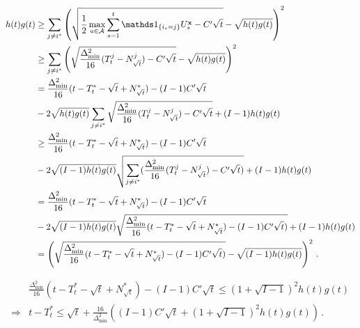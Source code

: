 \begin{align*}
    h(t)g(t) &\ge \sum_{j\neq i^*} \left(\sqrt{\frac{1}{2}\max_{a\in \mathcal A} \sum_{s=1}^t \ind_{\{i_s=j\}} U_s^\bx - C'\sqrt{t}} - \sqrt{h(t)g(t)}\right)^2\\
    &\ge \sum_{j\neq i^*} \left(\sqrt{\frac{\Delta_{\min}^2}{16} (T_t^j - N_{\sqrt{t}}^j) - C'\sqrt{t}} - \sqrt{h(t)g(t)}\right)^2\\
    &= \frac{\Delta_{\min}^2}{16} (t - T_t^* - \sqrt{t} + N_{\sqrt{t}}^*) - (I-1)C'\sqrt{t}\\
    &- 2\sqrt{h(t)g(t)}\sum_{j\neq i^*}\sqrt{\frac{\Delta_{\min}^2}{16} (T_t^j - N_{\sqrt{t}}^j) - C'\sqrt{t}} + (I-1)h(t)g(t)\\
    &\ge \frac{\Delta_{\min}^2}{16} (t - T_t^* - \sqrt{t} + N_{\sqrt{t}}^*) - (I-1)C'\sqrt{t}\\
    &- 2\sqrt{(I-1) h(t)g(t)}\sqrt{\sum_{j\neq i^*}(\frac{\Delta_{\min}^2}{16} (T_t^j - N_{\sqrt{t}}^j) - C'\sqrt{t})} + (I-1)h(t)g(t)\\
    &= \frac{\Delta_{\min}^2}{16} (t - T_t^* - \sqrt{t} + N_{\sqrt{t}}^*) - (I-1)C'\sqrt{t}\\
    &- 2\sqrt{(I-1) h(t)g(t)}\sqrt{\frac{\Delta_{\min}^2}{16} (t - T_t^* - \sqrt{t} + N_{\sqrt{t}}^*) - (I-1)C'\sqrt{t})} + (I-1)h(t)g(t)\\
    &= \left( \sqrt{\frac{\Delta_{\min}^2}{16} (t - T_t^* - \sqrt{t} + N_{\sqrt{t}}^*) - (I-1)C'\sqrt{t})} - \sqrt{(I-1) h(t)g(t)} \right)^2\,.
\end{align*}

\begin{align*}
    &\frac{\Delta_{\min}^2}{16} (t - T_t^* - \sqrt{t} + N_{\sqrt{t}}^*) - (I-1)C'\sqrt{t} \le (1 + \sqrt{I-1})^2 h(t)g(t)\\
    \Rightarrow
    &t - T_t^*
    \le \sqrt{t} + \frac{16}{\Delta_{\min}^2}\left((I-1)C'\sqrt{t} + (1 + \sqrt{I-1})^2 h(t)g(t)\right)\,.
\end{align*}